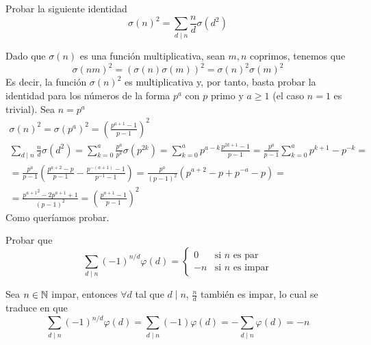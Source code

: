 \documentclass[twoside]{article}
\begin{document}
\newpage


\begin{ejercicio}{11}
Probar la siguiente identidad	
\[
\sigma(n)^2 = \sum_{d\mid n} \frac{n}{d}\sigma(d^2) 
\]
\begin{sol}
Dado que $\sigma(n)$ es una función multiplicativa, sean $m,n$ coprimos, tenemos que
\[
\sigma(nm)^2 = (\sigma(n)\sigma(m))^2 = \sigma(n)^2\sigma(m)^2
\]
Es decir, la función $\sigma(n)^2$ es multiplicativa y, por tanto, basta probar la identidad para los números de la forma $p^a$ con $p$ primo y $a\geq 1$ (el caso $n=1$ es trivial). Sea $n=p^a$
\begin{gather*}
\sigma(n)^2 = \sigma(p^a)^2 = \left(\frac{p^{a+1}-1}{p-1}\right)^2\\  \sum_{d\mid n} \frac{n}{d}\sigma(d^2) = \sum_{k=0}^a \frac{p^a}{p^k}\sigma(p^{2k})= \sum_{k=0}^a p^{a-k}\frac{p^{2k+1}-1}{p-1} = \frac{p^a}{p-1} \sum_{k=0}^a p^{k+1}- p^{-k} = \\
 = \frac{p^a}{p-1} \left(\frac{p^{a+2}-p}{p-1}-\frac{p^{-(a+1)}-1}{p^{-1}-1}\right) = \frac{p^a}{(p-1)^2}(p^{a+2}-p+ p^{-a}-p) = \\
 = \frac{{p^{a+1}}^2-2p^{a+1}+1}{(p-1)^2} =  \left(\frac{p^{a+1}-1}{p-1}\right)^2
\end{gather*}
Como queríamos probar.
\end{sol}
\end{ejercicio}


\newpage


\begin{ejercicio}{13}
Probar que	
\[
\sum_{d\mid n} (-1)^{n/d}\varphi(d) = 
\begin{cases}
0 & \text{si $n$ es par}\\ 
-n & \text{si $n$ es impar}
\end{cases}
\]
\begin{sol}
Sea $n \in \mathbb{N}$ impar, entonces $\forall d$ tal que $d \mid n$, $\frac{n}{d}$ también es impar, lo cual se traduce en que
\[
\sum_{d\mid n} (-1)^{n/d}\varphi(d) = \sum_{d\mid n} (-1)\varphi(d) = -\sum_{d\mid n}\varphi(d) = -n
\]
\end{sol}
\end{ejercicio}
\end{document}
